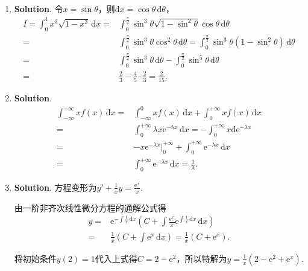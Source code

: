 \documentclass[../Main.tex]{subfiles}
\begin{document}
\begin{enumerate}
    \item \textbf{Solution}. 令$x=\sin\theta$，则$\mathrm{d}x=\cos\theta\,\mathrm{d}
              \theta$，
          \[
              \begin{aligned}
                  I = \int_{0}^{1}x^{3}\sqrt{1-x^2}\,\mathrm{d}x = & \int_{0}^{\frac{\pi}{2}}\sin^{3}\theta\sqrt{1-\sin^2\theta}\cos\theta\,\mathrm{d}\theta                                                             \\
                  =                                                & \int_{0}^{\frac{\pi}{2}}\sin^{3}\theta\cos^{2}\theta\,\mathrm{d}\theta = \int_{0}^{\frac{\pi}{2}}\sin^{3}\theta(1-\sin^{2}\theta)\,\mathrm{d}\theta \\
                  =                                                & \int_{0}^{\frac{\pi}{2}}\sin^{3}\theta\,\mathrm{d}\theta - \int_{0}^{\frac{\pi}{2}}\sin^{5}\theta\,\mathrm{d}\theta                                 \\
                  =                                                & \frac{2}{3}-\frac{4}{5}\cdot\frac{2}{3}= \frac{2}{15}.
              \end{aligned}
          \]

    \item \textbf{Solution}.
          \[
              \begin{aligned}
                  \int_{-\infty}^{+\infty}xf(x)\,\mathrm{d}x = & \int_{-\infty}^{0}xf(x)\,\mathrm{d}x+\int_{0}^{+\infty}xf(x)\,\mathrm{d}x                                                \\
                  =                                            & \int_{0}^{+\infty}\lambda x \mathrm{e}^{-\lambda x}\,\mathrm{d}x =-\int_{0}^{+\infty}x \mathrm{d}\mathrm{e}^{-\lambda x} \\
                  =                                            & -x\mathrm{e}^{-\lambda x}\bigg|_{0}^{+\infty}+\int_{0}^{+\infty}\mathrm{e}^{-\lambda x}\,\mathrm{d}x                     \\
                  =                                            & \int_{0}^{+\infty}\mathrm{e}^{-\lambda x}\,\mathrm{d}x = \frac{1}{\lambda}.
              \end{aligned}
          \]

    \item \textbf{Solution}. 方程变形为$y'+\frac{1}{x}y=\frac{\mathrm{e}^{x}}{x}$.

          由一阶非齐次线性微分方程的通解公式得
          \[
              \begin{aligned}
                  y = & \mathrm{e}^{-\int\frac{1}{x}\,\mathrm{d}x}\left(C+\int \frac{\mathrm{e}^x}{x}\mathrm{e}^{\int\frac{1}{x}\,\mathrm{d}x}\,\mathrm{d}x\right) \\
                  =   & \frac{1}{x}\left(C+\int \mathrm{e}^{x}\,\mathrm{d}x\right) = \frac{1}{x}\left(C+\mathrm{e}^{x}\right).
              \end{aligned}
          \]

          将初始条件$y(2)=1$代入上式得$C=2-\mathrm{e}^{2}$，所以特解为$y=\frac{1}{x}\left
              (2-\mathrm{e}^{2}+\mathrm{e}^{x}\right)$.
\end{enumerate}
\end{document}
